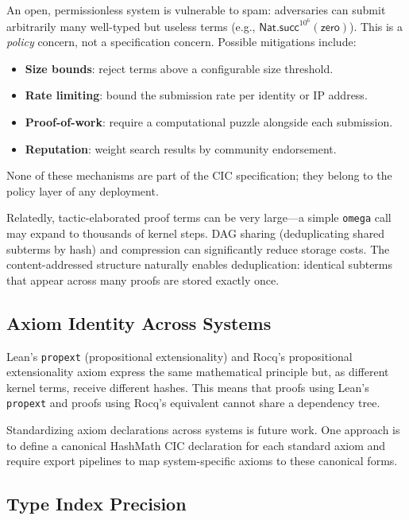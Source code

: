 \documentclass[11pt]{article}
\theoremstyle{definition}
\theoremstyle{plain}
\theoremstyle{remark}
\begin{document}
An open, permissionless system is vulnerable to spam: adversaries can submit
arbitrarily many well-typed but useless terms (e.g., $\textsf{Nat.succ}^{10^6}(\textsf{zero})$).
This is a \emph{policy} concern, not a specification concern.
Possible mitigations include:
\begin{itemize}[nosep]
  \item \textbf{Size bounds}: reject terms above a configurable size threshold.
  \item \textbf{Rate limiting}: bound the submission rate per identity or IP address.
  \item \textbf{Proof-of-work}: require a computational puzzle alongside each submission.
  \item \textbf{Reputation}: weight search results by community endorsement.
\end{itemize}
None of these mechanisms are part of the CIC specification; they belong to the
policy layer of any deployment.

Relatedly, tactic-elaborated proof terms can be very large---a simple \texttt{omega} call
may expand to thousands of kernel steps.
DAG sharing (deduplicating shared subterms by hash) and compression can significantly
reduce storage costs.
The content-addressed structure naturally enables deduplication: identical subterms that
appear across many proofs are stored exactly once.

\subsection{Axiom Identity Across Systems}
\label{sec:axiom-identity}

Lean's \texttt{propext} (propositional extensionality) and Rocq's propositional extensionality
axiom express the same mathematical principle but, as different kernel terms, receive different hashes.
This means that proofs using Lean's \texttt{propext} and proofs using Rocq's equivalent
cannot share a dependency tree.

Standardizing axiom declarations across systems is future work.
One approach is to define a canonical HashMath CIC declaration for each standard axiom
and require export pipelines to map system-specific axioms to these canonical forms.

\subsection{Type Index Precision}
\label{sec:index-precision}
\end{document}
